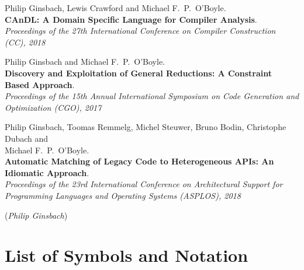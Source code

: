 \documentclass[phd,icsa,twoside,logo,11pt]{infthesis}
\begin{document}
\begin{preliminary}
\begin{declaration}
    \begin{description}
    \small
        \item[\hspace{0.35cm}\citep{Ginsbach:2018:CDS:3178372.3179515}]
              Philip Ginsbach, Lewis Crawford and Michael F.\ P.\ O'Boyle.\\
              {\bf CAnDL: A Domain Specific Language for Compiler Analysis}.\\
              {\em Proceedings of the 27th International Conference on
               Compiler Construction (CC), 2018}
        \item[\hspace{0.35cm}\citep{ginsbach2017discovery}]
              Philip Ginsbach and Michael F.\ P.\ O'Boyle.\\
              {\bf Discovery and Exploitation of General Reductions: A
              Constraint Based Approach}.\\
              {\em Proceedings of the 15th Annual International
               Symposium on Code Generation and\\Optimization (CGO), 2017}
        \item[\hspace{0.35cm}\citep{Ginsbach:2018:AML:3173162.3173182}]
              Philip Ginsbach, Toomas Remmelg, Michel Steuwer, Bruno Bodin,
              Christophe Dubach and\\Michael F.\ P.\ O'Boyle.\\
              {\bf Automatic Matching of Legacy Code to Heterogeneous APIs: An
              Idiomatic Approach}.\\
              {\em Proceedings of the 23rd International Conference on
               Architectural Support for\\Programming Languages and Operating
               Systems (ASPLOS), 2018}
    \end{description}

    \par
\vspace{1in}\raggedleft({\em Philip Ginsbach})
\end{declaration}
\tableofcontents
\end{preliminary}

\chapter*{List of Symbols and Notation}
    
\end{document}
